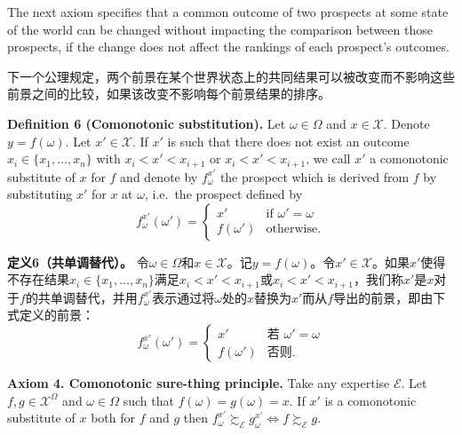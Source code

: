 \documentclass[12pt,a4paper]{article}
\newenvironment{original}
  {\par\noindent\ignorespaces}
  {\par}
\newenvironment{translation}
  {\par\noindent{\color{transblue}\ignorespaces}}
  {\par\medskip}
\begin{document}
\begin{original}
The next axiom specifies that a common outcome of two prospects at some state of the world can be changed without impacting the comparison between those prospects, if the change does not affect the rankings of each prospect's outcomes.
\end{original}

\begin{translation}
下一个公理规定，两个前景在某个世界状态上的共同结果可以被改变而不影响这些前景之间的比较，如果该改变不影响每个前景结果的排序。
\end{translation}

\begin{original}
\textbf{Definition 6 (Comonotonic substitution).} Let $\omega \in \Omega$ and $x \in \mathcal{X}$. Denote $y = f(\omega)$. Let $x' \in \mathcal{X}$. If $x'$ is such that there does not exist an outcome $x_{i} \in \{x_{1}, \dots, x_{n}\}$ with $x_{i} < x' < x_{i+1}$ or $x_{i} < x' < x_{i+1}$, we call $x'$ a comonotonic substitute of $x$ for $f$ and denote by $f^{x'}_{\omega}$ the prospect which is derived from $f$ by substituting $x'$ for $x$ at $\omega$, i.e.\ the prospect defined by
\[
f^{x'}_{\omega}(\omega') =
\begin{cases}
x' & \text{if } \omega' = \omega\\
f(\omega') & \text{otherwise}.
\end{cases}
\]
\end{original}

\begin{translation}
\textbf{定义6（共单调替代）。} 令$\omega \in \Omega$和$x \in \mathcal{X}$。记$y = f(\omega)$。令$x' \in \mathcal{X}$。如果$x'$使得不存在结果$x_{i} \in \{x_{1}, \dots, x_{n}\}$满足$x_{i} < x' < x_{i+1}$或$x_{i} < x' < x_{i+1}$，我们称$x'$是$x$对于$f$的共单调替代，并用$f^{x'}_{\omega}$表示通过将$\omega$处的$x$替换为$x'$而从$f$导出的前景，即由下式定义的前景：
\[
f^{x'}_{\omega}(\omega') =
\begin{cases}
x' & \text{若 } \omega' = \omega\\
f(\omega') & \text{否则}.
\end{cases}
\]
\end{translation}

\begin{original}
\textbf{Axiom 4. Comonotonic sure-thing principle.} Take any expertise $\mathcal{E}$. Let $f, g \in \mathcal{X}^{\Omega}$ and $\omega \in \Omega$ such that $f(\omega) = g(\omega) = x$. If $x'$ is a comonotonic substitute of $x$ both for $f$ and $g$ then $f^{x'}_{\omega} \succsim_{\mathcal{E}} g^{x'}_{\omega} \iff f \succsim_{\mathcal{E}} g$.
\end{original}
\end{document}
